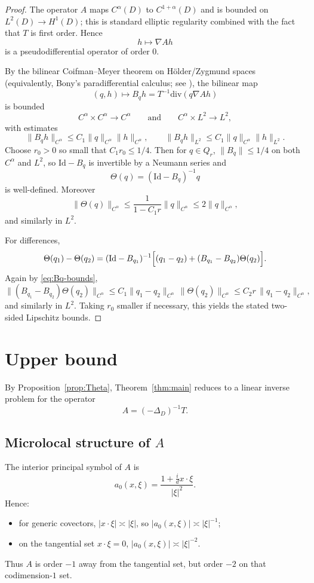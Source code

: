 \documentclass[11pt]{article}
\newcommand{\Id}{\mathrm{Id}}
\newcommand{\diver}{\mathrm{div}}
\begin{document}
\begin{proof}
The operator $A$ maps $C^\alpha(D)$ to $C^{1+\alpha}(D)$ and is bounded on $L^2(D)\to H^1(D)$; this is standard elliptic regularity combined with the fact that $T$ is first order. Hence
\[
h\mapsto \nabla Ah
\]
is a pseudodifferential operator of order $0$.

By the bilinear Coifman--Meyer theorem on Hölder/Zygmund spaces (equivalently, Bony's paradifferential calculus; see \cite[Ch.~2]{BCD}), the bilinear map
\[
(q,h)\mapsto B_q h=T^{-1}\diver(q\nabla Ah)
\]
is bounded
\[
C^\alpha\times C^\alpha\to C^\alpha
\qquad\text{and}\qquad
C^\alpha\times L^2\to L^2,
\]
with estimates
\begin{equation}\label{eq:Bq-bounds}
\|B_q h\|_{C^\alpha}\le C_1 \|q\|_{C^\alpha}\|h\|_{C^\alpha},
\qquad
\|B_q h\|_{L^2}\le C_1 \|q\|_{C^\alpha}\|h\|_{L^2}.
\end{equation}
Choose $r_0>0$ so small that $C_1 r_0\le 1/4$. Then for $q\in Q_r$, $\|B_q\|\le 1/4$ on both $C^\alpha$ and $L^2$, so $\Id-B_q$ is invertible by a Neumann series and
\[
\Theta(q)=(\Id-B_q)^{-1}q
\]
is well-defined. Moreover
\[
\|\Theta(q)\|_{C^\alpha}\le \frac{1}{1-C_1r}\|q\|_{C^\alpha}\le 2\|q\|_{C^\alpha},
\]
and similarly in $L^2$.

For differences,
\[
\Theta(q_1)-\Theta(q_2)
=
(\Id-B_{q_1})^{-1}\Bigl[(q_1-q_2)+(B_{q_1}-B_{q_2})\Theta(q_2)\Bigr].
\]
Again by \eqref{eq:Bq-bounds},
\[
\|(B_{q_1}-B_{q_2})\Theta(q_2)\|_{C^\alpha}
\le C_1\|q_1-q_2\|_{C^\alpha}\,\|\Theta(q_2)\|_{C^\alpha}
\le C_2 r\,\|q_1-q_2\|_{C^\alpha},
\]
and similarly in $L^2$. Taking $r_0$ smaller if necessary, this yields the stated two-sided Lipschitz bounds.
\end{proof}

\section{Upper bound}

By Proposition~\ref{prop:Theta}, Theorem~\ref{thm:main} reduces to a linear inverse problem for the operator
\[
A=(-\Delta_D)^{-1}T.
\]

\subsection*{Microlocal structure of $A$}

The interior principal symbol of $A$ is
\[
a_0(x,\xi)=\frac{1+\frac{i}{d}x\cdot \xi}{|\xi|^2}.
\]
Hence:
\begin{itemize}
\item for generic covectors, $|x\cdot \xi|\asymp |\xi|$, so $|a_0(x,\xi)|\asymp |\xi|^{-1}$;
\item on the tangential set $x\cdot \xi=0$, $|a_0(x,\xi)|\asymp |\xi|^{-2}$.
\end{itemize}
Thus $A$ is order $-1$ away from the tangential set, but order $-2$ on that codimension-$1$ set.
\end{document}
